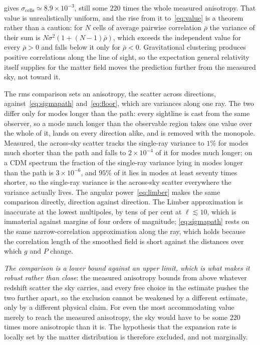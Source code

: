 \documentclass[11pt,a4paper]{article}
\begin{document}
gives $\sigma_{\mathrm{cells}}\simeq8.9\times10^{-3}$, still some $220$ times the whole measured anisotropy. That value is unrealistically uniform, and the rise from it to~\eqref{eq:value} is a theorem rather than a caution: for $N$ cells of average pairwise correlation $\bar\rho$ the variance of their sum is $N\sigma^{2}(1+(N-1)\bar\rho)$, which exceeds the independent value for every $\bar\rho>0$ and falls below it only for $\bar\rho<0$. Gravitational clustering produces positive correlations along the line of sight, so the expectation general relativity itself supplies for the matter field moves the prediction further from the measured sky, not toward it.

The rms comparison sets an anisotropy, the scatter across directions, against~\eqref{eq:sigmapath} and~\eqref{eq:floor}, which are variances along one ray. The two differ only for modes longer than the path: every sightline is cast from the same observer, so a mode much longer than the observable region takes one value over the whole of it, lands on every direction alike, and is removed with the monopole. Measured, the across-sky scatter tracks the single-ray variance to $1\%$ for modes much shorter than the path and falls to $2\times10^{-4}$ of it for modes much longer; on a CDM spectrum the fraction of the single-ray variance lying in modes longer than the path is $3\times10^{-6}$, and $95\%$ of it lies in modes at least seventy times shorter, so the single-ray variance is the across-sky scatter everywhere the variance actually lives. The angular power~\eqref{eq:limber} makes the same comparison directly, direction against direction. The Limber approximation is inaccurate at the lowest multipoles, by tens of per cent at $\ell\lesssim10$, which is immaterial against margins of four orders of magnitude; \eqref{eq:sigmapath} rests on the same narrow-correlation approximation along the ray, which holds because the correlation length of the smoothed field is short against the distances over which $g$ and $P$ change.

\emph{The comparison is a lower bound against an upper limit, which is what makes it robust rather than close}: the measured anisotropy bounds from above whatever redshift scatter the sky carries, and every free choice in the estimate pushes the two further apart, so the exclusion cannot be weakened by a different estimate, only by a different physical claim. For even the most accommodating value merely to reach the measured anisotropy, the sky would have to be some $220$ times more anisotropic than it is. The hypothesis that the expansion rate is locally set by the matter distribution is therefore excluded, and not marginally.
\end{document}
